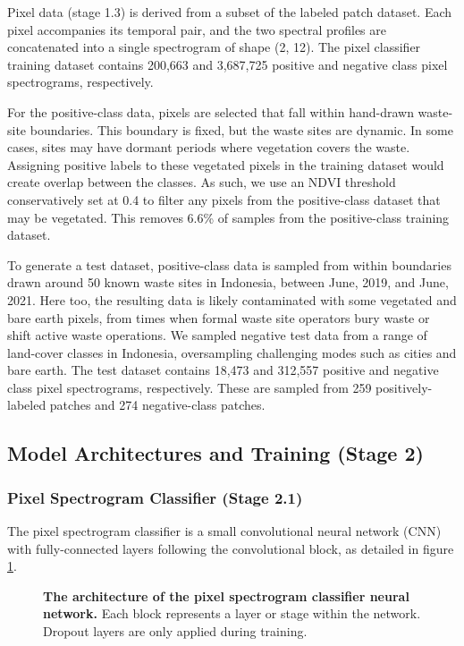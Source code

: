 \documentclass[10pt,letterpaper]{article}
\begin{document}
Pixel data (stage 1.3) is derived from a subset of the labeled patch dataset. Each pixel accompanies its temporal pair, and the two spectral profiles are concatenated into a single spectrogram of shape (2, 12). The pixel classifier training dataset contains 200,663 and 3,687,725 positive and negative class pixel spectrograms, respectively.

For the positive-class data, pixels are selected that fall within hand-drawn waste-site boundaries. This boundary is fixed, but the waste sites are dynamic. In some cases, sites may have dormant periods where vegetation covers the waste. Assigning positive labels to these vegetated pixels in the training dataset would create overlap between the classes. As such, we use an NDVI threshold conservatively set at 0.4 to filter any pixels from the positive-class dataset that may be vegetated. This removes 6.6\% of samples from the positive-class training dataset.

To generate a test dataset, positive-class data is sampled from within boundaries drawn around 50 known waste sites in Indonesia, between June, 2019, and June, 2021. Here too, the resulting data is likely contaminated with some vegetated and bare earth pixels, from times when formal waste site operators bury waste or shift active waste operations. We sampled negative test data from a range of land-cover classes in Indonesia, oversampling challenging modes such as cities and bare earth. The test dataset contains 18,473 and 312,557 positive and negative class pixel spectrograms, respectively. These are sampled from 259 positively-labeled patches and 274 negative-class patches.

\subsection*{Model Architectures and Training (Stage 2)}
\subsubsection*{Pixel Spectrogram Classifier (Stage 2.1)}
The pixel spectrogram classifier is a small convolutional neural network (CNN) with fully-connected layers following the convolutional block, as detailed in figure \ref{fig:pixel_architecture}.

\begin{figure}[!h]
    \caption{{\bf The architecture of the pixel spectrogram classifier neural network.}
    Each block represents a layer or stage within the network. Dropout layers are only applied during training.}
    \label{fig:pixel_architecture}
\end{figure}
\end{document}
